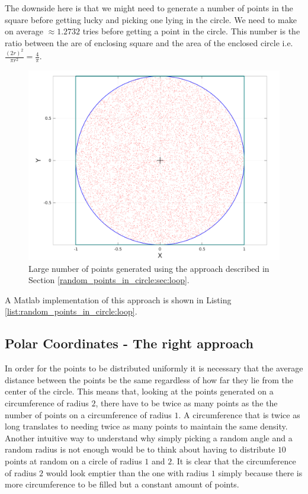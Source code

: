 The downside here is that we might need to generate a number of points in the square before getting lucky and picking one lying in the circle. We need to make on average $\approx 1.2732$ tries before getting a point in the circle. This number is  the ratio between the are of enclosing square and the area of the enclosed circle i.e. $\frac{(2r)^2}{\pi r^2} = \frac{4}{\pi}$. 

\begin{figure}
	\label{fig:random_points_in_cirle:loop}
	\centering
	\includegraphics[scale=0.3]{sources/random_points_in_circle/images/loop_points}
	\caption{Large number of points generated using the approach described in Section \ref{random_points_in_circle:sec:loop}.}
\end{figure}

A Matlab implementation of this approach is shown in Listing \ref{list:random_points_in_circle:loop}.



\subsection{Polar Coordinates - The right approach}
\label{random_points_in_circle:sec:polar_sqrt}


In order for the points to be distributed uniformly it is necessary that the average distance between the points be the same regardless of how far they lie from the center of the circle. This means that,  looking at the points generated on a circumference of radius $2$, there have to be twice as many points as the the number of points on a circumference of radius $1$. A circumference that is twice as long translates to needing twice as many points to maintain the same density. 
Another intuitive way to understand why simply picking a random angle and a random radius is not enough would be to think about having to distribute $10$ points at random on a circle of radius $1$ and $2$. It is clear that the circumference of radius $2$ would look emptier than the one with radius $1$ simply because there is more circumference to be filled but a constant amount of points. 

